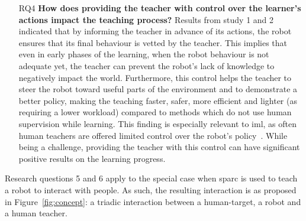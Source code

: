 \begin{itemize}
	\item [RQ4] \textbf{How does providing the teacher with control over the learner's actions impact the teaching process?} 
	Results from study 1 and 2 indicated that by informing the teacher in advance of its actions, the robot ensures that its final behaviour is vetted by the teacher. This implies that even in early phases of the learning, when the robot behaviour is not adequate yet, the teacher can prevent the robot's lack of knowledge to negatively impact the world. Furthermore, this control helps the teacher to steer the robot toward useful parts of the environment and to demonstrate a better policy, making the teaching faster, safer, more efficient and lighter (as requiring a lower workload) compared to methods which do not use human supervision while learning. This finding is especially relevant to \gls{iml}, as often human teachers are offered limited control over the robot's policy~\citep{thomaz2008teachable,knox2009interactively}. While being a challenge, providing the teacher with this control can have significant positive results on the learning progress.
\end{itemize}

Research questions 5 and 6 apply to the special case when \gls{sparc} is used to teach a robot to interact with people. As such, the resulting interaction is as proposed in Figure~\ref{fig:concept}: a triadic interaction between a human-target, a robot and a human teacher.

